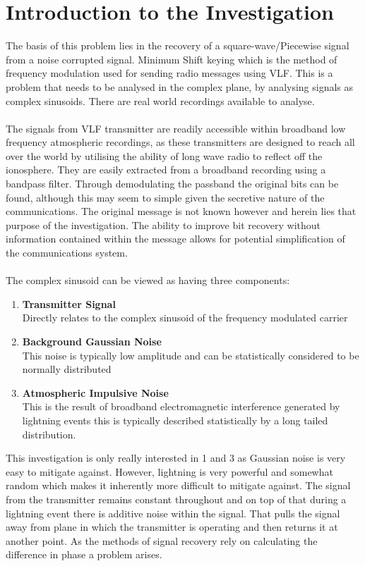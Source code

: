 \section{Introduction to the Investigation}
The basis of this problem lies in the recovery of a square-wave/Piecewise signal from a noise corrupted signal. Minimum Shift keying which is the method of frequency modulation used for sending radio messages using VLF. This is a problem that needs to be analysed in the complex plane, by analysing signals as complex sinusoids. There are real world recordings available to analyse. 
\\\\
The signals from VLF transmitter are readily accessible within broadband low frequency atmospheric recordings, as these transmitters are designed to reach all over the world by utilising the ability of long wave radio to reflect off the ionosphere. They are easily extracted from a broadband recording using a bandpass filter. Through demodulating the passband the original bits can be found, although this may seem to simple given the secretive nature of the communications. The original message is not known however and herein lies that purpose of the investigation. The ability to improve bit recovery without information contained within the message allows for potential simplification of the communications system.
\\\\
The complex sinusoid can be viewed as having three components:
\begin{enumerate}
    \item \textbf{Transmitter Signal }
    \\
    Directly relates to the complex sinusoid of the frequency modulated carrier
    \item \textbf{Background Gaussian Noise}
    \\
    This noise is typically low amplitude and can be statistically considered to be normally distributed
    \item \textbf{Atmospheric Impulsive Noise}
    \\
    This is the result of broadband electromagnetic interference generated by lightning events this is typically described statistically by a long tailed distribution.
\end{enumerate}
This investigation is only really interested in 1 and 3 as Gaussian noise is very easy to mitigate against. However, lightning is very powerful and somewhat random which makes it inherently more difficult to mitigate against. The signal from the transmitter remains constant throughout and on top of that during a lightning event there is additive noise within the signal. That pulls the signal away from plane in which the transmitter is operating and then returns it at another point. As the methods of signal recovery rely on calculating the difference in phase a problem arises.
